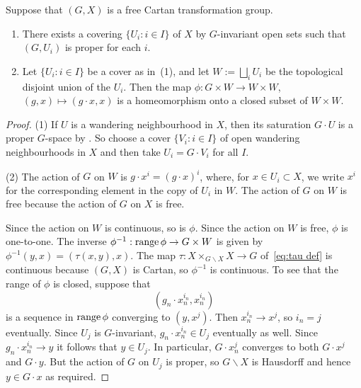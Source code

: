 \documentclass[12pt,a4paper]{amsart}
\begin{document}

\begin{lemma}\label{lem-leftaction}
Suppose that $(G,X)$ is a free Cartan transformation group.
\begin{enumerate}
    \item There exists a covering  $\{U_i : i \in I\}$  of
        $X$ by $G$-invariant open sets such that $(G, U_i)$
        is proper for each $i$.
    \item Let $\{U_i : i \in I\}$ be a cover as in~(1), and
        let $W := \bigsqcup_i U_i$ be the topological
        disjoint union of the $U_i$. Then
     the map $\phi: G\times W \to W \times W$,
            $(g,x)\mapsto (g\cdot x, x)$ is a
            homeomorphism onto a closed subset of $W
            \times W$.
\end{enumerate}
\end{lemma}

\begin{proof}
(1) If $U$ is a wandering neighbourhood in $X$, then its
saturation $G\cdot U$ is a proper $G$-space by
\cite[Proposition~1.2.4]{P}.  So choose a cover $\{V_i : i \in
I\}$ of open wandering neighbourhoods in $X$ and then take
$U_i=G\cdot V_i$ for all $I$.

(2) The action of $G$ on $W$ is $g\cdot x^i=(g\cdot x)^i$,
where, for $x \in U_i \subset X$, we write $x^i$ for the
corresponding element in the copy of $U_i$ in $W$. The action
of $G$ on $W$ is free because the action of $G$ on $X$ is free.

Since the action on $W$ is continuous, so is $\phi$.
Since the action on $W$  is free, $\phi$ is
one-to-one.  The inverse $\phi^{-1}:\operatorname{range}\phi\to G\times
W$ is given by $\phi^{-1}(y,x)=(\tau(x,y),x)$. The
map $\tau:X\times_{G\backslash X} X\to G$ of~\eqref{eq:tau def}
is continuous because $(G,X)$ is Cartan, so $\phi^{-1}$ is
continuous. To see that the range of $\phi$ is closed, suppose
that
\[
    (g_n\cdot x_n^{i_n}, x_n^{i_n})
\]
is a sequence in $\operatorname{range}\phi$ converging to $(y,x^j)$.  Then
$x_n^{i_n}\to x^j$, so $i_n=j$ eventually. Since $U_j$ is
$G$-invariant, $g_n\cdot x_n^{i_n}\in U_j$ eventually as well.
Since $g_n\cdot x_n^{i_n}\to y$ it follows that $y\in U_j$. In
particular, $G\cdot x_n^j$ converges to both $G\cdot x^j$ and
$G\cdot y$. But the action of $G$ on $U_j$ is proper, so
$G\backslash X$ is Hausdorff and hence $y\in G\cdot x$ as
required.
\end{proof}
\end{document}
